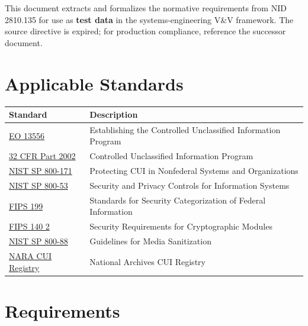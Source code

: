 \documentclass[11pt,letterpaper]{article}
\begin{document}
This document extracts and formalizes the normative requirements from NID 2810.135 for use as \textbf{test data} in the systems-engineering V\&V framework. The source directive is expired; for production compliance, reference the successor document.

\section{Applicable Standards}

\begin{tabularx}{\textwidth}{lX}
\toprule
\textbf{Standard} & \textbf{Description} \\
\midrule
\href{https://www.archives.gov/cui/registry/policy-guidance}{EO 13556} & Establishing the Controlled Unclassified Information Program \\
\href{https://www.ecfr.gov/current/title-32/subtitle-B/chapter-XX/part-2002}{32 CFR Part 2002} & Controlled Unclassified Information Program \\
\href{https://csrc.nist.gov/pubs/sp/800/171/r3/final}{NIST SP 800-171} & Protecting CUI in Nonfederal Systems and Organizations \\
\href{https://csrc.nist.gov/pubs/sp/800/53/r5/upd1/final}{NIST SP 800-53} & Security and Privacy Controls for Information Systems \\
\href{https://csrc.nist.gov/pubs/fips/199/final}{FIPS 199} & Standards for Security Categorization of Federal Information \\
\href{https://csrc.nist.gov/pubs/fips/140-2/final}{FIPS 140 2} & Security Requirements for Cryptographic Modules \\
\href{https://csrc.nist.gov/pubs/sp/800/88/r1/final}{NIST SP 800-88} & Guidelines for Media Sanitization \\
\href{https://www.archives.gov/cui}{NARA CUI Registry} & National Archives CUI Registry \\
\bottomrule
\end{tabularx}

\section{Requirements}
\end{document}
